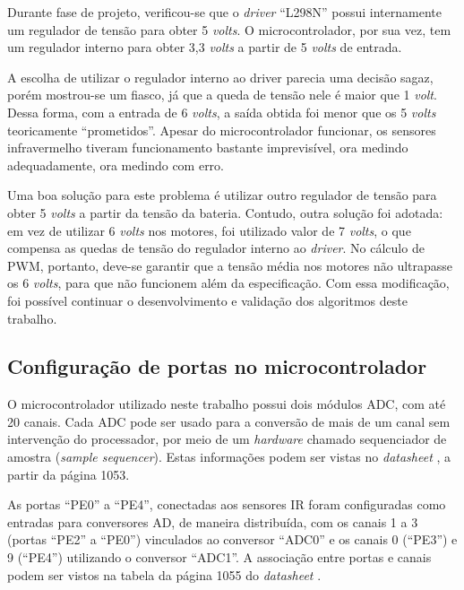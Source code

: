 	Durante fase de projeto, verificou-se que o \textit{driver} ``L298N'' possui internamente 
	um regulador de tensão para obter 5 \textit{volts}. O microcontrolador, por sua vez, tem 
	um regulador interno para obter 3,3 \textit{volts} a partir de 5 \textit{volts} de entrada. 
	
	A escolha de utilizar o regulador interno ao driver parecia uma decisão sagaz, porém
	mostrou-se um fiasco, já que a queda de tensão nele é maior que 1 \textit{volt}. Dessa 
	forma, com a entrada de 6 \textit{volts}, a saída obtida foi menor que os 5 \textit{volts} 
	teoricamente ``prometidos''. Apesar do microcontrolador funcionar, os sensores 
	infravermelho tiveram funcionamento bastante imprevisível, ora medindo adequadamente, 
	ora medindo com erro. 
	
	Uma boa solução para este problema é utilizar outro regulador de tensão para obter 
	5 \textit{volts} a partir da tensão da bateria. Contudo, outra solução foi adotada:
	em vez de utilizar 6 \textit{volts} nos motores, foi utilizado valor de 7 
	\textit{volts}, o que compensa as quedas de tensão do regulador interno ao 
	\textit{driver}. No cálculo de PWM, portanto, deve-se garantir que a tensão média nos 
	motores não ultrapasse os 6 \textit{volts}, para que não funcionem além da 
	especificação. Com essa modificação, foi possível continuar o desenvolvimento e 
	validação dos algoritmos deste trabalho.
	
	\subsection{Configuração de portas no microcontrolador}
	
	O microcontrolador utilizado neste trabalho possui dois módulos
	ADC, com até 20 canais. Cada ADC pode ser usado para a conversão de mais de um canal sem
	intervenção do processador, por meio de um \textit{hardware} chamado sequenciador de 
	amostra (\textit{sample sequencer}). Estas informações podem ser vistas no 
	\textit{datasheet} \cite{datasheet:TivaC}, a partir da página 1053.
	
	As portas ``PE0'' a ``PE4'', conectadas aos sensores IR foram configuradas como entradas
	para conversores AD, de maneira distribuída, com os canais 1 a 3 (portas ``PE2'' a ``PE0'')
	vinculados ao conversor ``ADC0'' e os canais 0 (``PE3'') e 9 (``PE4'') utilizando o 
	conversor ``ADC1''. A associação entre portas e canais podem ser vistos na tabela da 
	página 1055 do \textit{datasheet} \cite{datasheet:TivaC}. 
	
